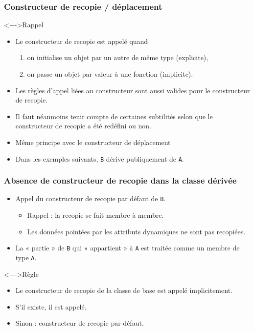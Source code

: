 \begin{frame}
\frametitle{Constructeur de recopie / déplacement}
\begin{exampleblock}<+->{Rappel}
\begin{itemize}[<+->]
\item Le constructeur de recopie est appelé quand
	\begin{enumerate}
	\item on initialise un objet par un autre de même type (explicite),
	\item on passe un objet par valeur à une fonction (implicite).
	\end{enumerate}
\end{itemize}
\end{exampleblock}
\begin{itemize}[<+->]
\item Les règles d'appel liées au constructeur sont aussi valides pour le constructeur de recopie.
\item Il faut néanmoins tenir compte de certaines subtilités selon que le constructeur de recopie a été redéfini ou non.
\item Même principe avec le constructeur de déplacement
\item Dans les exemples suivants, \texttt{B} dérive publiquement de \texttt{A}.
\end{itemize}
\end{frame}

\begin{frame}
\frametitle{Absence de constructeur de recopie dans la classe dérivée}
\begin{itemize}[<+->]
\item Appel du constructeur de recopie par défaut de \texttt{B}.
	\begin{itemize}
	\item Rappel : la recopie se fait membre à membre.
	\item Les données pointées par les attributs dynamiques ne sont pas recopiées.
	\end{itemize}
\item La « partie » de \texttt{B} qui « appartient » à \texttt{A} est traitée comme un membre de type \texttt{A}.
\end{itemize}
\begin{exampleblock}<+->{Règle}
\begin{itemize}[<+->]
\item Le constructeur de recopie de la classe de base est appelé implicitement.
\end{itemize}
\end{exampleblock}
\begin{itemize}[<+->]
\item S'il existe, il est appelé.
\item Sinon : constructeur de recopie par défaut. 
\end{itemize}
\end{frame}


